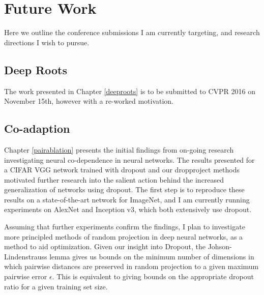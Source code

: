 \documentclass[thesis]{subfiles}
\begin{document}

\chapter{Future Work}  %


Here we outline the conference submissions I am currently targeting, and research directions I wish to pursue.

\section{Deep Roots}
The work presented in Chapter \ref{deeproots} is to be submitted to CVPR 2016 on November 15th, however with a re-worked motivation.
	
\section{Co-adaption}
Chapter \ref{pairablation} presents the initial findings from on-going research investigating neural co-dependence in neural networks. The results presented for a CIFAR VGG network trained with dropout and our dropproject methods motivated further research into the salient action behind the increased generalization of networks using dropout. The first step is to reproduce these results on a state-of-the-art network for ImageNet, and I am currently running experiments on AlexNet and Inception v3, which both extensively use dropout.

Assuming that further experiments confirm the findings, I plan to investigate more principled methods of random projection in deep neural networks, as a method to aid optimization. Given our insight into Dropout, the Johson-Lindenstrauss lemma gives us bounds on the minimum number of dimensions in which pairwise distances are preserved in random projection to a given maximum pairwise error $\epsilon$. This is equivalent to giving bounds on the appropriate dropout ratio for a given training set size.
\end{document}
